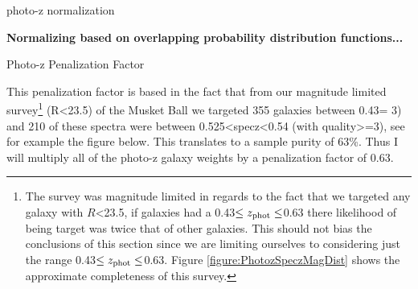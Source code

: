 photo-z normalization

\textbf{Normalizing based on overlapping probability distribution functions...}

%
%

Photo-z Penalization Factor

This penalization factor is based in the fact that from our magnitude limited survey\footnote{The survey was magnitude limited in regards to the fact that we targeted any galaxy with $R$<23.5, if galaxies had a 0.43$\leq z_{\rm phot} \leq$0.63 there likelihood of being target was twice that of other galaxies. This should not bias the conclusions of this section since we are limiting ourselves to considering just the range 0.43$\leq z_{\rm phot} \leq$0.63. Figure \ref{figure:PhotozSpeczMagDist} shows the approximate completeness of this survey.} (R<23.5) of the Musket Ball we targeted 355 galaxies between 0.43= 3) and 210 of these spectra were between 0.525<specz<0.54 (with quality>=3), see for example the figure below. This translates to a sample purity of 63\%.  Thus I will multiply all of the photo-z galaxy weights by a penalization factor of 0.63.




